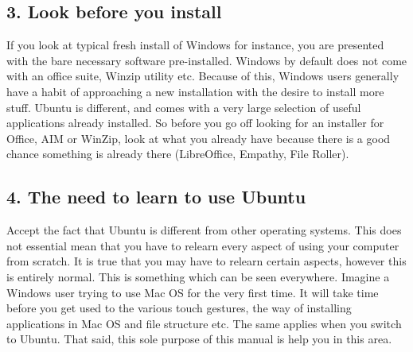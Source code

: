 \subsection*{3. Look before you install}
If you look at typical fresh install of Windows for instance, you are presented with the bare necessary software pre-installed. Windows by default does not come with an office suite, Winzip utility etc. Because of this, Windows users generally have a habit of approaching a new installation with the desire to install more stuff. Ubuntu is different, and comes with a very large selection of useful applications already installed. So before you go off looking for an installer for Office, AIM or WinZip, look at what you already have because there is a good chance something is already there (LibreOffice, Empathy, File Roller).

\subsection*{4. The need to learn to use Ubuntu}
Accept the fact that Ubuntu is different from other operating systems. This does not essential mean that you have to relearn every aspect of using your computer from scratch. It is true that you may have to relearn certain aspects, however this is entirely normal. This is something which can be seen everywhere. Imagine a Windows user trying to use Mac OS for the very first time. It will take time before you get used to the various touch gestures, the way of installing applications in Mac OS and file structure etc. The same applies when you switch to Ubuntu.  That said, this sole purpose of this manual is help you in this area. 
